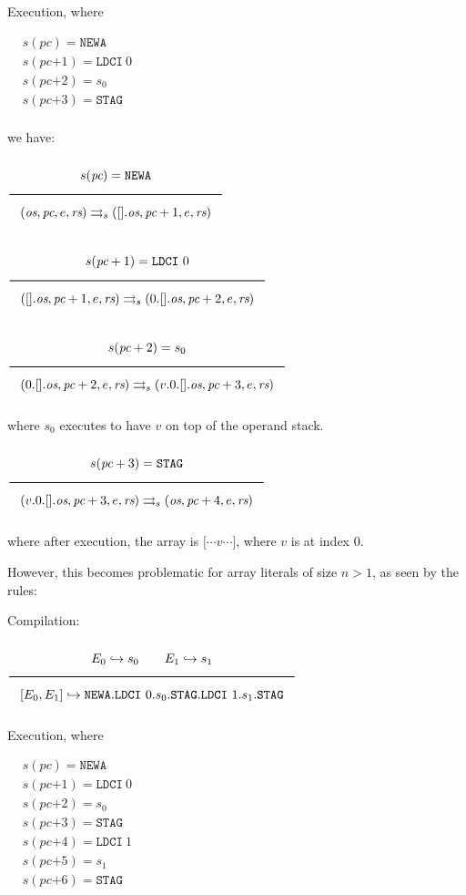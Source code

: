 Execution, where

$\begin{aligned}
& s(\textit{pc}) = \texttt{NEWA}\\
& s(\textit{pc+1}) = \texttt{LDCI}\ 0\\
& s(\textit{pc+2}) = s_0\\
& s(\textit{pc+3}) = \texttt{STAG}\\
\end{aligned}$

we have:

$\Rule{s(\textit{pc}) = \texttt{NEWA}}{
(\textit{os},\textit{pc},e,\textit{rs}) \transition
(\lbrack\rbrack.\textit{os},\textit{pc}+1,e,\textit{rs})}
$

$\Rule{s(\textit{pc}+1) = \texttt{LDCI}\ 0}{
(\lbrack\rbrack.\textit{os},\textit{pc}+1,e,\textit{rs}) \transition
(0.\lbrack\rbrack.\textit{os},\textit{pc}+2,e,\textit{rs})}
$

$\Rule{s(\textit{pc}+2) = s_0}{
(0.\lbrack\rbrack.\textit{os},\textit{pc}+2,e,\textit{rs}) \transition
(v.0.\lbrack\rbrack.\textit{os},\textit{pc}+3,e,\textit{rs})}
$

where $s_0$ executes to have $v$ on top of the operand stack.

$\Rule{s(\textit{pc}+3) = \texttt{STAG}}{
(v.0.\lbrack\rbrack.\textit{os},\textit{pc}+3,e,\textit{rs}) \transition
(\textit{os},\textit{pc}+4,e,\textit{rs})}
$

where after execution, the array is $\lbrack\cdots v \cdots\rbrack$, where $v$ is at index $0$.

However, this becomes problematic for array literals of size $n > 1$, as seen by the rules:

Compilation:

$\Rule{E_0 \translateaux s_0 \qquad E_1 \translateaux s_1}{
\lbrack E_0, E_1 \rbrack \translateaux \texttt{NEWA}
.\texttt{LDCI}\ 0.s_0.\texttt{STAG}
.\texttt{LDCI}\ 1.s_1.\texttt{STAG}}
$

Execution, where

$\begin{aligned}
& s(\textit{pc}) = \texttt{NEWA}\\
& s(\textit{pc+1}) = \texttt{LDCI}\ 0\\
& s(\textit{pc+2}) = s_0\\
& s(\textit{pc+3}) = \texttt{STAG}\\
& s(\textit{pc+4}) = \texttt{LDCI}\ 1\\
& s(\textit{pc+5}) = s_1\\
& s(\textit{pc+6}) = \texttt{STAG}\\
\end{aligned}$

